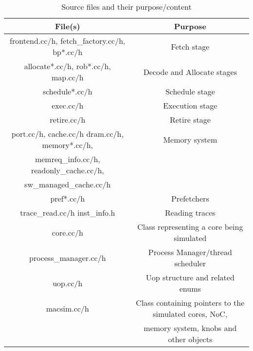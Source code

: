 \begin{table}[htb]
\begin{footnotesize}
\begin{center}
\caption{Source files and their purpose/content}
\label{table:file_list}
\begin{tabular}{|c||c|}
\hline 
File(s)                                                      & Purpose                            \\ \hline
frontend.cc/h, fetch\_factory.cc/h, bp*.cc/h                 & Fetch stage                        \\ \hline 
allocate*.cc/h, rob*.cc/h, map.cc/h                          & Decode and Allocate stages         \\ \hline
schedule*.cc/h                                               & Schedule stage                     \\ \hline 
exec.cc/h                                                    & Execution stage                    \\ \hline 
retire.cc/h                                                  & Retire stage                       \\ \hline       
port.cc/h, cache.cc/h dram.cc/h, memory*.cc/h, 				 & Memory system 					  \\ 
memreq\_info.cc/h, readonly\_cache.cc/h, 					 & 									  \\ 
sw\_managed\_cache.cc/h                                      & 				                      \\ \hline 
pref*.cc/h                                                   & Prefetchers                        \\ \hline
trace\_read.cc/h inst\_info.h                                & Reading traces                     \\ \hline
core.cc/h                                                    & Class representing a core being simulated \\ \hline
process\_manager.cc/h                                        & Process Manager/thread scheduler   \\ \hline 
uop.cc/h                                                     & Uop structure and related enums    \\ \hline
macsim.cc/h					                                 & Class containing pointers to the simulated cores, NoC, \\
                                                             & memory system, knobs and other objects \\ \hline

\end{tabular}
\end{center}
\end{footnotesize}
\end{table}
